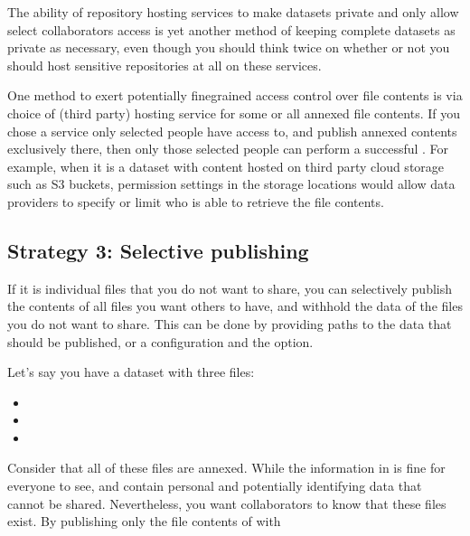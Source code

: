 \sphinxAtStartPar
The ability of repository hosting services to make datasets private and only allow select collaborators access is yet another method of keeping complete datasets as private as necessary, even though you should think twice on whether or not you should host sensitive repositories at all on these services.

\sphinxAtStartPar
One method to exert potentially fine\sphinxhyphen{}grained access control over file contents is via choice of (third party) hosting service for some or all annexed file contents.
If you chose a service only selected people have access to, and publish annexed contents exclusively there, then only those selected people can perform a successful .
For example, when it is a dataset with content hosted on third party cloud storage such as S3 buckets, permission settings in the storage locations would allow data providers to specify or limit who is able to retrieve the file contents.


\subsection{Strategy 3: Selective publishing}
\label{\detokenize{basics/101-139-privacy:strategy-3-selective-publishing}}
\sphinxAtStartPar
If it is individual files that you do not want to share, you can selectively publish the contents of all files you want others to have, and withhold the data of the files you do not want to share.
This can be done by providing paths to the data that should be published, or a  configuration and the  option.

\sphinxAtStartPar
Let’s say you have a dataset with three files:
\begin{itemize}
\item {} 
\sphinxAtStartPar
{}

\item {} 
\sphinxAtStartPar
{}

\item {} 
\sphinxAtStartPar
{}

\end{itemize}

\sphinxAtStartPar
Consider that all of these files are annexed. While the information in  is fine for everyone to see,  and  contain personal and potentially identifying data that cannot be shared.
Nevertheless, you want collaborators to know that these files exist.
By publishing only the file contents of  with

